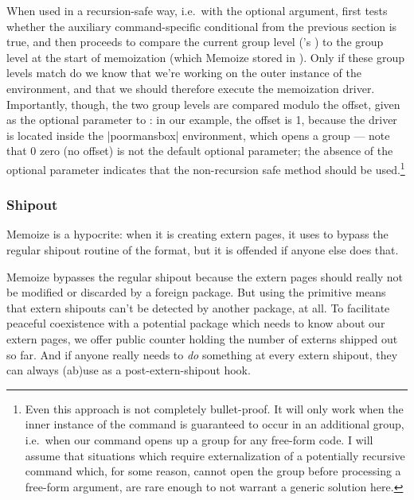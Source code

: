 \documentclass[a4paper,11pt]{article}
\begin{document}
When used in a recursion-safe way, i.e.\ with the optional argument,
 first tests whether the auxiliary command-specific
conditional from the previous section is true, and then proceeds to compare the
current group level ('s ) to the group
level at the start of memoization (which Memoize stored in
).  Only if these group levels match do we know
that we're working on the outer instance of the environment, and that we should
therefore execute the memoization driver.  Importantly, though, the two group
levels are compared modulo the offset, given as the optional parameter to
: in our example, the offset is 1, because the driver is
located inside the |poormansbox| environment, which opens a group --- note that
0 zero (no offset) is not the default optional parameter; the absence of the
optional parameter indicates that the non-recursion safe method should be
used.\footnote{Even this approach is not completely bullet-proof.  It will only
  work when the inner instance of the command is guaranteed to occur in an
  additional group, i.e.\ when our command opens up a group for any free-form
  code.  I will assume that situations which require externalization of a
  potentially recursive command which, for some reason, cannot open the group
  before processing a free-form argument, are rare enough to not warrant a
  generic solution here.}


\FloatBarrier


\subsubsection{Shipout}

Memoize is a hypocrite: when it is creating extern pages, it uses
 to bypass the regular shipout routine of the
format, but it is offended if anyone else does that.

Memoize bypasses the regular shipout because the extern pages should really not
be modified or discarded by a foreign package.  But using the primitive
 means that extern shipouts can't be detected by another
package, at all.  To facilitate peaceful coexistence with a potential package
which needs to know about our extern pages, we offer public counter
 holding the number of externs shipped out so far.  And
if anyone really needs to \emph{do} something at every extern shipout, they can
always (ab)use  as a
post-extern-shipout hook.
\end{document}
